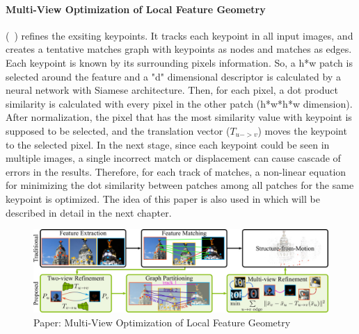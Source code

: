 \documentclass[11pt]{article}
\begin{document}
    \paragraph{Multi-View Optimization of Local Feature Geometry} (~\cite{Dusmanu2020Multi}) refines the exsiting keypoints. It tracks each keypoint in all input images, and creates a tentative
    matches graph with keypoints as nodes and matches as edges. Each keypoint is known by its surrounding pixels
    information. So, a h*w patch is selected around the feature and a "d" dimensional descriptor is calculated by
    a neural network with Siamese architecture. Then, for each pixel, a dot product similarity is calculated
    with every pixel in the other patch (h*w*h*w dimension). After normalization, the pixel that has the most
    similarity value with keypoint is supposed to be selected, and the translation vector ($T_{u->v}$)
    moves the keypoint to the selected pixel. In the next stage, since each keypoint could be seen in multiple images,
    a single incorrect match or displacement can cause cascade of errors in the results. Therefore, for each track of
    matches, a non-linear equation for minimizing the dot similarity between patches among all patches for the same
    keypoint is optimized. The idea of this paper is also used in \cite{lindenberger2021pixsfm} which will be
    described in detail in the next chapter.

    \begin{figure}
    \centering
    \includegraphics[width=\textwidth,height=\textheight,keepaspectratio]{images/dusmano.jpg}
    \caption{Paper: Multi-View Optimization of Local Feature Geometry}
    \end{figure}
\end{document}
